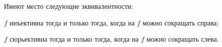 Имеют место следующие эквивалентности:
\begin{enumcyr}
    \item $f$ инъективна тогда и только тогда, когда на $f$ можно сокращать справа;
    \item $f$ сюрьективна тогда и только тогда, когда на $f$ можно сокращать слева.
\end{enumcyr}

